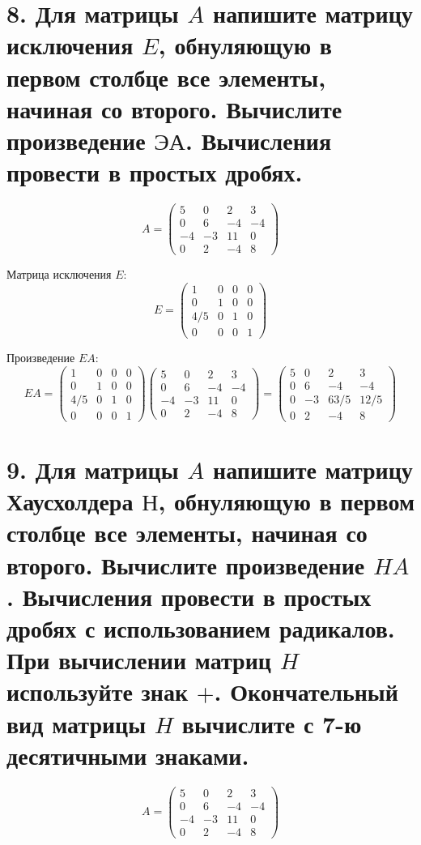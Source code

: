 \documentclass[a4paper,14pt]{article}
\begin{document}
\section{8. Для матрицы $A$ напишите матрицу исключения $E$, обнуляющую в первом столбце все элементы, начиная со второго. Вычислите произведение $ЭА$. Вычисления провести в простых дробях.}
$$
A = \begin{pmatrix}
5 & 0 & 2 & 3 \\
0 & 6 & -4 & -4 \\
-4 & -3 & 11 & 0 \\
0 & 2 & -4 & 8
\end{pmatrix}
$$

Матрица исключения $E$:
$$
E = \begin{pmatrix}
    1 & 0 & 0 & 0 \\
    0 & 1 & 0 & 0 \\
    4/5 & 0 & 1 & 0 \\
    0 & 0 & 0 & 1
\end{pmatrix}
$$

Произведение $EA$:
$$
EA = \begin{pmatrix}
    1 & 0 & 0 & 0 \\
    0 & 1 & 0 & 0 \\
    4/5 & 0 & 1 & 0 \\
    0 & 0 & 0 & 1
\end{pmatrix}
\begin{pmatrix}
    5 & 0 & 2 & 3 \\
    0 & 6 & -4 & -4 \\
    -4 & -3 & 11 & 0 \\
    0 & 2 & -4 & 8
\end{pmatrix}
=
\begin{pmatrix}
    5 & 0 & 2 & 3 \\
    0 & 6 & -4 & -4 \\
    0 & -3 & 63/5 & 12/5 \\
    0 & 2 & -4 & 8
\end{pmatrix}
$$

\section{9. Для матрицы $A$ напишите матрицу Хаусхолдера $Н$, обнуляющую в первом столбце все элементы, начиная со второго. Вычислите произведение $HA$. Вычисления провести в простых дробях с использованием радикалов. При вычислении матриц $H$ используйте знак $+$. Окончательный вид матрицы $H$ вычислите с 7-ю десятичными знаками.}
$$
A = \begin{pmatrix}
5 & 0 & 2 & 3 \\
0 & 6 & -4 & -4 \\
-4 & -3 & 11 & 0 \\
0 & 2 & -4 & 8
\end{pmatrix}
$$
\end{document}
